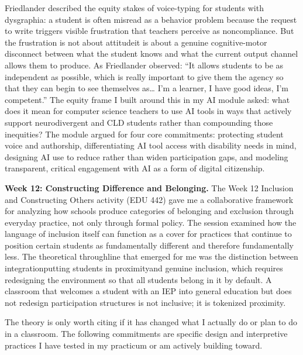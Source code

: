 \documentclass[12pt]{article}
\begin{document}
Friedlander described the equity stakes of voice-typing for students with dysgraphia: a student is often misread as a behavior problem because the request to write triggers visible frustration that teachers perceive as noncompliance. But the frustration is not about attitude\textemdash{}it is about a genuine cognitive-motor disconnect between what the student knows and what the current output channel allows them to produce. As Friedlander observed: ``It allows students to be as independent as possible, which is really important to give them the agency so that they can begin to see themselves as\ldots{} I'm a learner, I have good ideas, I'm competent.'' The equity frame I built around this in my AI module asked: what does it mean for computer science teachers to use AI tools in ways that actively support neurodivergent and CLD students rather than compounding those inequities? The module argued for four core commitments: protecting student voice and authorship, differentiating AI tool access with disability needs in mind, designing AI use to reduce rather than widen participation gaps, and modeling transparent, critical engagement with AI as a form of digital citizenship.

\textbf{Week 12: Constructing Difference and Belonging.}
The Week 12 Inclusion and Constructing Others activity (EDU 442) gave me a collaborative framework for analyzing how schools produce categories of belonging and exclusion through everyday practice, not only through formal policy. The session examined how the language of inclusion itself can function as a cover for practices that continue to position certain students as fundamentally different and therefore fundamentally less. The theoretical throughline that emerged for me was the distinction between integration\textemdash{}putting students in proximity\textemdash{}and genuine inclusion, which requires redesigning the environment so that all students belong in it by default. A classroom that welcomes a student with an IEP into general education but does not redesign participation structures is not inclusive; it is tokenized proximity.

\newpage

The theory is only worth citing if it has changed what I actually do or plan to do in a classroom. The following commitments are specific design and interpretive practices I have tested in my practicum or am actively building toward.
\end{document}
